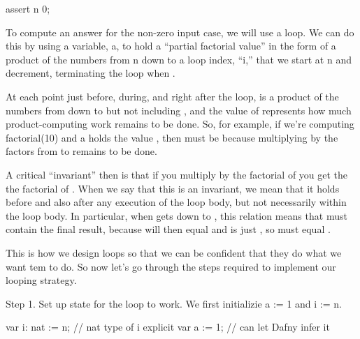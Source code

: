 \documentclass[letterpaper,10pt,english]{sphinxmanual}
\begin{document}
\begin{sphinxVerbatim}[commandchars=\\\{\}]
assert n \PYGZgt{} 0;
\end{sphinxVerbatim}

To compute an answer for the non-zero input case, we will use a loop.
We can do this by using a variable, a, to hold a “partial factorial
value” in the form of a product of the numbers from n down to a loop
index, “i,” that we start at n and decrement, terminating the loop
when .

At each point just before, during, and right after the loop,  is a
product of the numbers from  down to but not including , and the
value of  represents how much product-computing work remains to be
done. So, for example, if we’re computing factorial(10) and a holds
the value , then  must be  because multiplying  by
the factors from  to  remains to be done.

A critical “invariant” then is that if you multiply  by the
factorial of  you get the the factorial of .  When we say that
this is an invariant, we mean that it holds before and also after any
execution of the loop body, but not necessarily within the loop
body. In particular, when  gets down to , this relation means
that  must contain the final result, because  will
then equal  and  is just , so  must equal
.

This is how we design loops so that we can be confident that they do
what we want tem to do. So now let’s go through the steps required to
implement our looping strategy.

Step 1. Set up state for the loop to work. We first initializie a := 1
and i := n.

\begin{sphinxVerbatim}[commandchars=\\\{\}]
var i: nat := n;    // nat type of i explicit
var a := 1;         // can let Dafny infer it
\end{sphinxVerbatim}
\end{document}
